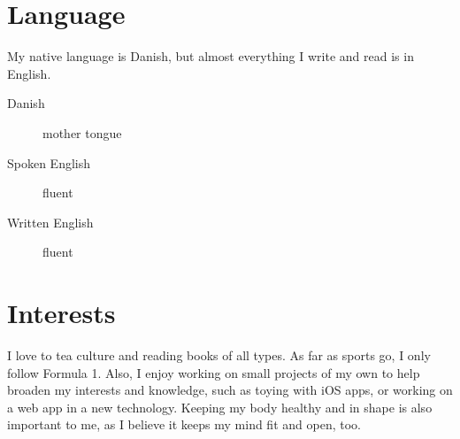 \documentclass[margin,line]{resume}
\begin{document}
\begin{resume}
\section{\mysidestyle{} Language}
My native language is Danish, but almost everything I write and read is in English.

\begin{description}
  \item[Danish] mother tongue
  \item[Spoken English] fluent
  \item[Written English] fluent 
\end{description}

\section{\mysidestyle{} Interests}
I love to tea culture and reading books of all types. As far as sports go, I only follow Formula 1. Also, I enjoy working on small projects of my own to help broaden my interests and knowledge, such as toying with iOS apps, or working on a web app in a new technology. Keeping my body healthy and in shape is also important to me, as I believe it keeps my mind fit and open, too.

\end{resume}
\end{document}
